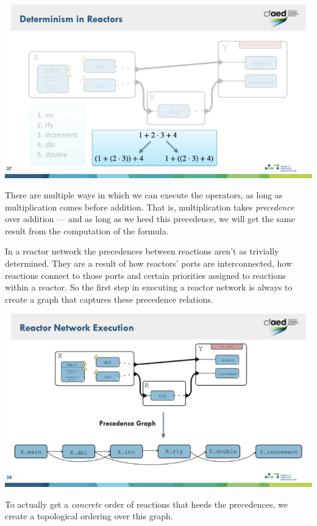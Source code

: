 \documentclass{article}
\begin{document}
\begin{center}
    \includegraphics[width=\columnwidth]{Slides/Slide 27.jpeg}
\end{center}

There are multiple ways in which we can execute the operators, as long as multiplication comes before addition.
That is, multiplication takes \emph{precedence} over addition --- and as long as we heed this precedence, we will get the same result from the computation of the formula.

In a reactor network the precedences between reactions aren't as trivially determined.
They are a result of how reactors' ports are interconnected, how reactions connect to those ports and certain priorities assigned to reactions within a reactor.
So the first step in executing a reactor network is always to create a graph that captures these precedence relations.

\begin{center}
    \includegraphics[width=\columnwidth]{Slides/Slide 28.jpeg}
\end{center}

To actually get a \emph{concrete} order of reactions that heeds the precedences, we create a topological ordering over this graph.
\end{document}
